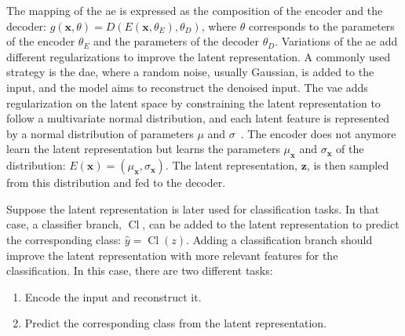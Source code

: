 \documentclass[../main.tex]{subfiles}
\begin{document}
		The mapping of the \gls{ae} is expressed as the composition of the encoder and the decoder: \(g\left(\symbf{x}, \theta\right) = D\left(E\left(\symbf{x}, \theta_E\right), \theta_D\right)\), where \(\theta\) corresponds to the parameters of the encoder \(\theta_E\) and the parameters of the decoder \(\theta_D\).
		Variations of the \gls{ae} add different regularizations to improve the latent representation.
		A commonly used strategy is the \gls{dae}, where a random noise, usually Gaussian, is added to the input, and the model aims to reconstruct the denoised input.
		The \gls{vae} adds regularization on the latent space by constraining the latent representation to follow a multivariate normal distribution, and each latent feature is represented by a normal distribution of parameters \(\mu\) and \(\sigma\)~\cite{VAEref}.
		The encoder does not anymore learn the latent representation but learns the parameters \(\mu_{\symbf{x}}\) and \(\sigma_{\symbf{x}}\) of the distribution: \(E\left(\symbf{x}\right) = \left(\mu_{\symbf{x}},\sigma_{\symbf{x}}\right) \).
		The latent representation, \(\symbf{z}\), is then sampled from this distribution and fed to the decoder.

		Suppose the latent representation is later used for classification tasks.
		In that case, a classifier branch, \(\operatorname{Cl}\), can be added to the latent representation to predict the corresponding class: \(\hat{y} = \operatorname{Cl}\left(z\right)\).
		Adding a classification branch should improve the latent representation with more relevant features for the classification.
		In this case, there are two different tasks:
		\begin{enumerate}[nosep]
			\item Encode the input and reconstruct it.
			\item Predict the corresponding class from the latent representation.
		\end{enumerate}
\end{document}
